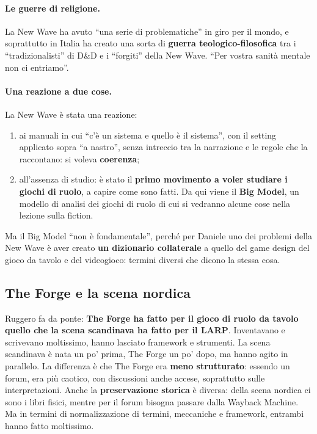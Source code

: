 \paragraph{Le guerre di religione.} La New Wave ha avuto ``una serie di
problematiche'' in giro per il mondo, e soprattutto in Italia ha creato una
sorta di \textbf{guerra teologico-filosofica} tra i ``tradizionalisti'' di D\&D e
i ``forgiti'' della New Wave. ``Per vostra sanità mentale non ci entriamo''.

\paragraph{Una reazione a due cose.} La New Wave è stata una reazione:
\begin{enumerate}
  \item ai manuali in cui ``c'è un sistema e quello è il sistema'', con il
        setting applicato sopra ``a nastro'', senza intreccio tra la narrazione
        e le regole che la raccontano: si voleva \textbf{coerenza};
  \item all'assenza di studio: è stato il \textbf{primo movimento a voler
        studiare i giochi di ruolo}, a capire come sono fatti. Da qui viene il
        \textbf{Big Model}, un modello di analisi dei giochi di ruolo di cui si
        vedranno alcune cose nella lezione sulla fiction.
\end{enumerate}
Ma il Big Model ``non è fondamentale'', perché per Daniele uno dei problemi della
New Wave è aver creato \textbf{un dizionario collaterale} a quello del game design
del gioco da tavolo e del videogioco: termini diversi che dicono la stessa cosa.

\subsection{The Forge e la scena nordica}

Ruggero fa da ponte: \textbf{The Forge ha fatto per il gioco di ruolo da tavolo
quello che la scena scandinava ha fatto per il LARP}. Inventavano e scrivevano
moltissimo, hanno lasciato framework e strumenti. La scena scandinava è nata un
po' prima, The Forge un po' dopo, ma hanno agito in parallelo. La differenza è
che The Forge era \textbf{meno strutturato}: essendo un forum, era più caotico,
con discussioni anche accese, soprattutto sulle interpretazioni. Anche la
\textbf{preservazione storica} è diversa: della scena nordica ci sono i libri
fisici, mentre per il forum bisogna passare dalla Wayback Machine. Ma in termini
di normalizzazione di termini, meccaniche e framework, entrambi hanno fatto
moltissimo.

